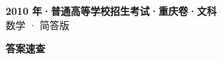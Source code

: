 \documentclass[zihao=-4, a4paper]{ctexart}
\begin{document}
\begin{center}
  {\Large\bfseries 2010 年·普通高等学校招生考试·重庆卷·文科}\\[4pt]
  {\large 数学 · 简答版}
\end{center}
\medskip
{}

\clearpage
{}
\begin{center}{\Large\bfseries 答案速查}\end{center}
\medskip

\end{document}
